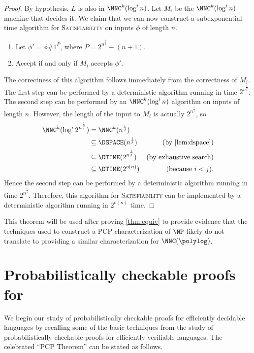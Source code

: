 \documentclass[]{article}
\begin{document}
\begin{proof}
  By hypothesis, $L$ is also in $\NNC^k(\log^i n)$.
  Let $M_i$ be the $\NNC^k(\log^i n)$ machine that decides it.
  We claim that we can now construct a subexponential time algorithm for \textsc{Satisfiability} on inputs $\phi$ of length $n$.
  \begin{enumerate}
  \item Let $\phi' = \phi \# 1^P$, where $P = 2^{n^{\frac{1}{j}}} - (n + 1)$.
  \item Accept if and only if $M_i$ accepts $\phi'$.
  \end{enumerate}
  The correctness of this algorithm follows immediately from the correctness of $M_i$.
  The first step can be performed by a deterministic algorithm running in time $2^{n^{\frac{1}{j}}}$.
  The second step can be performed by an $\NNC^k(\log^i n)$ algorithm on inputs of length $n$.
  However, the length of the input to $M_i$ is actually $2^{n^{\frac{1}{j}}}$, so
  \begin{align*}
    \NNC^k(\log^i{2^{n^{\frac{1}{j}}}}) & = \NNC^k(n^{\frac{i}{j}}) & \\
    & \subseteq \DSPACE(n^{\frac{i}{j}}) & \text{(by \autoref{lem:dspace})} \\
    & \subseteq \DTIME(2^{n^{\frac{i}{j}}}) & \text{(by exhaustive search)} \\
    & \subseteq \DTIME(2^{o(n)}) & \text{(because } i < j \text{).}
  \end{align*}
  Hence the second step can be performed by a deterministic algorithm running in time $2^{n^{\frac{i}{j}}}$.
  Therefore, this algorithm for \textsc{Satisfiability} can be implemented by a deterministic algorithm running in $2^{o(n)}$ time.
\end{proof}

This theorem will be used after proving \autoref{thm:equiv} to provide evidence that the techniques used to construct a PCP characterization of $\NP$ likely do not translate to providing a similar characterization for $\NNC(\polylog)$.

\section{Probabilistically checkable proofs for \texorpdfstring{\NP}{NP}}

We begin our study of probabilistically checkable proofs for efficiently decidable languages by recalling some of the basic techniques from the study of probabilistically checkable proofs for efficiently verifiable languages.
The celebrated ``PCP Theorem'' can be stated as follows.
\end{document}
